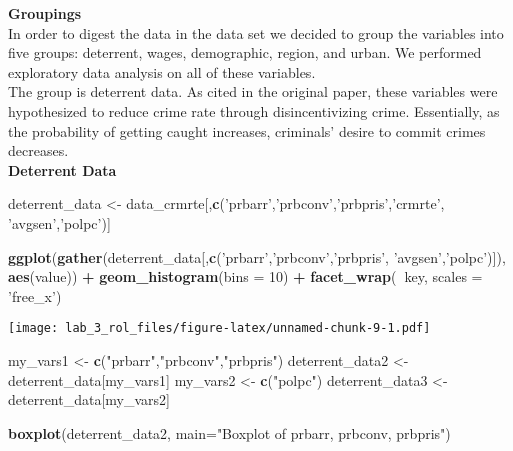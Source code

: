 \documentclass[
]{article}
\newenvironment{Shaded}{\begin{snugshade}}{\end{snugshade}}
\newcommand{\DataTypeTok}[1]{\textcolor[rgb]{0.13,0.29,0.53}{#1}}
\newcommand{\DecValTok}[1]{\textcolor[rgb]{0.00,0.00,0.81}{#1}}
\newcommand{\KeywordTok}[1]{\textcolor[rgb]{0.13,0.29,0.53}{\textbf{#1}}}
\newcommand{\NormalTok}[1]{#1}
\newcommand{\OperatorTok}[1]{\textcolor[rgb]{0.81,0.36,0.00}{\textbf{#1}}}
\newcommand{\StringTok}[1]{\textcolor[rgb]{0.31,0.60,0.02}{#1}}
\begin{document}
\textbf{Groupings}\\
In order to digest the data in the data set we decided to group the
variables into five groups: deterrent, wages, demographic, region, and
urban. We performed exploratory data analysis on all of these
variables.\\

The group is deterrent data. As cited in the original paper, these
variables were hypothesized to reduce crime rate through
disincentivizing crime. Essentially, as the probability of getting
caught increases, criminals' desire to commit crimes decreases.\\

\textbf{Deterrent Data}\\

\begin{Shaded}
\begin{Highlighting}[]
\NormalTok{deterrent_data <-}\StringTok{ }\NormalTok{data_crmrte[,}\KeywordTok{c}\NormalTok{(}\StringTok{'prbarr'}\NormalTok{,}\StringTok{'prbconv'}\NormalTok{,}\StringTok{'prbpris'}\NormalTok{,}\StringTok{'crmrte'}\NormalTok{,}
                          \StringTok{'avgsen'}\NormalTok{,}\StringTok{'polpc'}\NormalTok{)]}

\KeywordTok{ggplot}\NormalTok{(}\KeywordTok{gather}\NormalTok{(deterrent_data[,}\KeywordTok{c}\NormalTok{(}\StringTok{'prbarr'}\NormalTok{,}\StringTok{'prbconv'}\NormalTok{,}\StringTok{'prbpris'}\NormalTok{,}
                                    \StringTok{'avgsen'}\NormalTok{,}\StringTok{'polpc'}\NormalTok{)]), }\KeywordTok{aes}\NormalTok{(value)) }\OperatorTok{+}\StringTok{ }
\KeywordTok{geom_histogram}\NormalTok{(}\DataTypeTok{bins =} \DecValTok{10}\NormalTok{) }\OperatorTok{+}\StringTok{ }\KeywordTok{facet_wrap}\NormalTok{(}\OperatorTok{~}\NormalTok{key, }\DataTypeTok{scales =} \StringTok{'free_x'}\NormalTok{)}
\end{Highlighting}
\end{Shaded}

\texttt{[image: lab\_3\_rol\_files/figure-latex/unnamed-chunk-9-1.pdf]}

\begin{Shaded}
\begin{Highlighting}[]
\NormalTok{my_vars1 <-}\StringTok{ }\KeywordTok{c}\NormalTok{(}\StringTok{"prbarr"}\NormalTok{,}\StringTok{"prbconv"}\NormalTok{,}\StringTok{"prbpris"}\NormalTok{)}
\NormalTok{deterrent_data2 <-}\StringTok{ }\NormalTok{deterrent_data[my_vars1]}
\NormalTok{my_vars2 <-}\StringTok{ }\KeywordTok{c}\NormalTok{(}\StringTok{"polpc"}\NormalTok{)}
\NormalTok{deterrent_data3 <-}\StringTok{ }\NormalTok{deterrent_data[my_vars2]}

\KeywordTok{boxplot}\NormalTok{(deterrent_data2, }\DataTypeTok{main=}\StringTok{"Boxplot of prbarr, prbconv, prbpris"}\NormalTok{)}
\end{Highlighting}
\end{Shaded}
\end{document}
